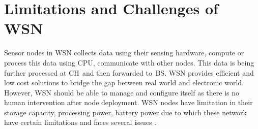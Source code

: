 \section{Limitations and Challenges of WSN} \label{WSNChallenges}
Sensor nodes in WSN collects data using their sensing hardware, compute or process this data using CPU, communicate with other nodes. This data is being further processed at CH\textcolor{white}{e}and then forwarded to\textcolor{white}{e}BS. WSN provides efficient and low cost solutions to bridge the gap between real world and electronic world. However, WSN should be able to manage and configure itself as there is no human intervention after node deployment. WSN nodes have limitation in their storage capacity, processing power, battery power due to which these network have certain limitations and faces several issues \cite{sharma2013issues}.

